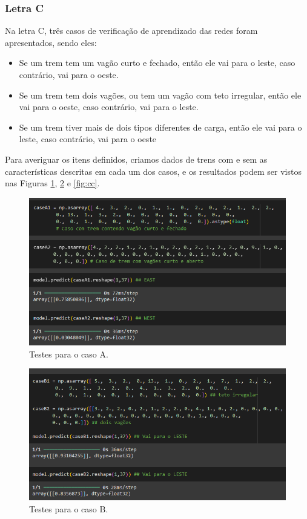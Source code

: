 \documentclass[12pt]{article}
\begin{document}
\subsubsection{Letra C}
Na letra C, três casos de verificação de aprendizado das redes foram apresentados, sendo eles:

\begin{itemize}
    \item Se um trem tem um vagão curto e fechado, então ele vai para o leste, caso
contrário, vai para o oeste.
    \item Se um trem tem dois vagões, ou tem um vagão com teto irregular, então ele
vai para o oeste, caso contrário, vai para o leste.
    \item Se um trem tiver mais de dois tipos diferentes de carga, então ele vai para o
leste, caso contrário, vai para o oeste
\end{itemize}

Para averiguar os itens definidos, criamos dados de trens com e sem as características descritas em cada um dos casos, e os resultados podem ser vistos nas Figuras \ref{fig:ca}, \ref{fig:cb} e \ref{fig:cc}.

\begin{figure}[h]
    \centering
    \includegraphics[width=0.8\linewidth]{3CA.png}
    \caption{Testes para o caso A.}
    \label{fig:ca}
\end{figure}

\begin{figure}[h]
    \centering
    \includegraphics[width=0.8\linewidth]{3CB.png}
    \caption{Testes para o caso B.}
    \label{fig:cb}
\end{figure}
\end{document}
